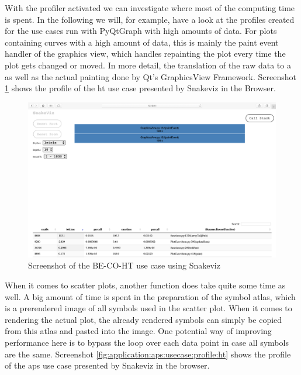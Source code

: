 With the profiler activated we can investigate where most of the computing time
is spent. In the following we will, for example, have a look at the profiles
created for the use cases run with PyQtGraph with high amounts of data. For
plots containing curves with a high amount of data, this is mainly the paint
event handler of the graphics view, which handles repainting the plot every time
the plot gets changed or moved. In more detail, the translation of the raw data
to a  as well as the actual painting done
by Qt's GraphicsView Framework. Screenshot
\ref{fig:application:lhc:usecase:profile:ht} shows the profile of the \gls{ht}
use case presented by Snakeviz in the Browser.

\begin{figure}[h]
    \centering
    \includegraphics[width=15cm]{resources/img/profiles/HtProfile}
    \caption{Screenshot of the BE-CO-HT use case using Snakeviz}
    \label{fig:application:lhc:usecase:profile:ht}
\end{figure}

When it comes to scatter plots, another function does take quite some time as
well. A big amount of time is spent in the preparation of the symbol atlas,
which is a prerendered image of all symbols used in the scatter plot. When it
comes to rendering the actual plot, the already rendered symbols can simply be
copied from this atlas and pasted into the image. One potential way of improving
performance here is to bypass the loop over each data point in case all symbols
are the same. Screenshot \ref{fig:application:aps:usecase:profile:ht} shows the
profile of the \gls{aps} use case presented by Snakeviz in the browser.

